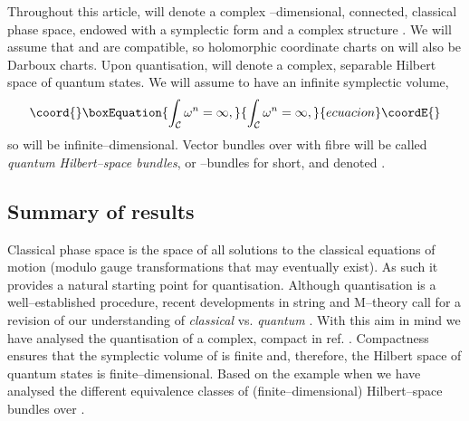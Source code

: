 \documentclass[a4paper,a4paper]{article}
\begin{document}
Throughout this article, \coordHE{} will denote a complex \coordHE{}--dimensional, connected, 
classical phase space, endowed with a symplectic form \myHighlight{$\omega$}\coordHE{} 
and a complex structure \coordHE{}. We will assume that \myHighlight{$\omega$}\coordHE{} and \coordHE{} 
are compatible, so holomorphic coordinate charts on \coordHE{} will also 
be Darboux charts. Upon quantisation, \coordHE{} will denote a complex, 
separable Hilbert space of quantum states. We will assume \coordHE{} to have an infinite 
symplectic volume,
\begin{equation}\coord{}\boxEquation{
\int_{\cal C}\omega^n = \infty,
\label{isxvcc}
}{
\int_{\cal C}\omega^n = \infty,
}{ecuacion}\coordE{}\end{equation}
so \coordHE{} will be infinite--dimensional. Vector bundles over \coordHE{} with fibre 
\coordHE{} will be called {\it quantum Hilbert--space bundles}, or \coordHE{}--bundles 
for short, and denoted \coordHE{}.


\subsection{Summary of results}\label{ssmmrr}


Classical phase space is the space of all solutions to the classical equations 
of motion (modulo gauge transformations that may eventually exist). As such it provides 
a natural starting point for quantisation. Although quantisation is a well--established procedure, 
recent developments in string and M--theory call for a revision of our understanding of 
{\it classical}\/ vs. {\it quantum} \cite{VAFA}. With this aim in mind we have analysed 
the quantisation of a complex, compact \coordHE{} in ref. \cite{PQM}. Compactness ensures that 
the symplectic volume of \coordHE{} is finite and, therefore, the Hilbert space of quantum states 
is finite--dimensional. Based on the example when \coordHE{} we have analysed 
the different equivalence classes of (finite--dimensional) Hilbert--space bundles over \coordHE{}. 
\end{document}
